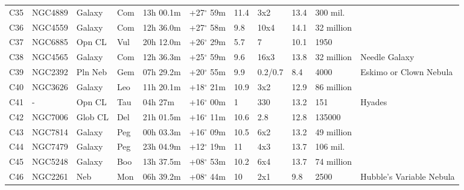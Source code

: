 \documentclass[10pt,twoside,a4paper,english]{article}
\begin{document}
\begin{longtable}{@{}lllllllllll@{}}
C35        & NGC4889     & Galaxy     & Com       & 13h 00.1m & +27$^{\circ}$ 59m  & 11.4      & 3x2                  & 13.4     & 300 mil.            &                                 \\ 
C36        & NGC4559     & Galaxy     & Com       & 12h 36.0m & +27$^{\circ}$ 58m  & 9.8       & 10x4                 & 14.1     & 32 million          &                                 \\ 
C37        & NGC6885     & Opn CL     & Vul       & 20h 12.0m & +26$^{\circ}$ 29m  & 5.7       & 7                    & 10.1     & 1950                &                                 \\ 
C38        & NGC4565     & Galaxy     & Com       & 12h 36.3m & +25$^{\circ}$ 59m  & 9.6       & 16x3                 & 13.8     & 32 million          & Needle Galaxy                   \\ 
C39        & NGC2392     & Pln Neb    & Gem       & 07h 29.2m & +20$^{\circ}$ 55m  & 9.9       & 0.2/0.7              & 8.4      & 4000                & Eskimo or Clown Nebula          \\ 
C40        & NGC3626     & Galaxy     & Leo       & 11h 20.1m & +18$^{\circ}$ 21m  & 10.9      & 3x2                  & 12.9     & 86 million          &                                 \\ 
C41        & -           & Opn CL     & Tau       & 04h 27m   & +16$^{\circ}$ 00m  & 1         & 330                  & 13.2     & 151                 & Hyades                          \\ 
C42        & NGC7006     & Glob CL    & Del       & 21h 01.5m & +16$^{\circ}$ 11m  & 10.6      & 2.8                  & 12.8     & 135000              &                                 \\ 
C43        & NGC7814     & Galaxy     & Peg       & 00h 03.3m & +16$^{\circ}$ 09m  & 10.5      & 6x2                  & 13.2     & 49 million          &                                 \\ 
C44        & NGC7479     & Galaxy     & Peg       & 23h 04.9m & +12$^{\circ}$ 19m  & 11        & 4x3                  & 13.7     & 106 mil.            &                                 \\ 
C45        & NGC5248     & Galaxy     & Boo       & 13h 37.5m & +08$^{\circ}$ 53m  & 10.2      & 6x4                  & 13.7     & 74 million          &                                 \\ 
C46        & NGC2261     & Neb        & Mon       & 06h 39.2m & +08$^{\circ}$ 44m  & 10        & 2x1                  & 9.8      & 2500                & Hubble's Variable Nebula        \\ 

\end{longtable}
\end{document}
